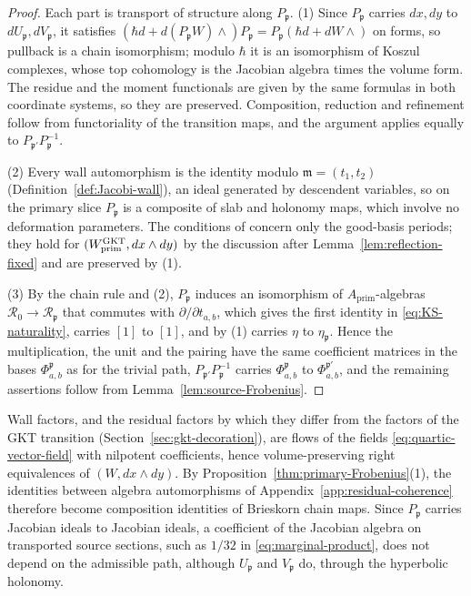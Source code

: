 \begin{proof}
Each part is transport of structure along $P_{\mathfrak p}$.  (1) Since
$P_{\mathfrak p}$ carries $dx,dy$ to $dU_{\mathfrak p},dV_{\mathfrak p}$, it
satisfies $(\hbar d+d(P_{\mathfrak p}W)\wedge)P_{\mathfrak p}
=P_{\mathfrak p}(\hbar d+dW\wedge)$ on forms, so pullback is a chain
isomorphism; modulo $\hbar$ it is an isomorphism of Koszul complexes, whose
top cohomology is the Jacobian algebra times the volume form.  The residue
and the moment functionals are given by the same formulas in both coordinate
systems, so they are preserved.  Composition, reduction and refinement
follow from functoriality of the transition maps, and the argument applies
equally to $P_{\mathfrak p'}P_{\mathfrak p}^{-1}$.

(2) Every wall automorphism is the identity modulo $\mathfrak m=(t_1,t_2)$
(Definition~\ref{def:Jacobi-wall}), an ideal generated by descendent
variables, so on the primary slice $P_{\mathfrak p}$ is a composite of slab
and holonomy maps, which involve no deformation parameters.  The conditions
of \cite[Def.~4.3]{grossetal2022open} concern only the good-basis periods; they hold for $(W^{\mathrm{GKT}}_{\mathrm{prim}},dx\wedge dy)$ by
the discussion after Lemma~\ref{lem:reflection-fixed} and are preserved by
(1).

(3) By the chain rule and (2), $P_{\mathfrak p}$ induces an isomorphism of
$A_{\mathrm{prim}}$-algebras $\mathcal R_0\to\mathcal R_{\mathfrak p}$ that
commutes with $\partial/\partial t_{a,b}$, which gives the first identity in
\eqref{eq:KS-naturality}, carries $[1]$ to $[1]$, and by (1) carries $\eta$
to $\eta_{\mathfrak p}$.  Hence the multiplication, the unit and the pairing
have the same coefficient matrices in the bases $\Phi^{\mathfrak p}_{a,b}$ as
for the trivial path, $P_{\mathfrak p'}P_{\mathfrak p}^{-1}$ carries
$\Phi^{\mathfrak p}_{a,b}$ to $\Phi^{\mathfrak p'}_{a,b}$, and the remaining
assertions follow from Lemma~\ref{lem:source-Frobenius}.
\end{proof}

Wall factors, and the residual factors by which they differ from the
factors of the GKT transition (Section~\ref{sec:gkt-decoration}), are flows of the fields
\eqref{eq:quartic-vector-field} with nilpotent coefficients, hence
volume-preserving right equivalences of $(W,dx\wedge dy)$.  By
Proposition~\ref{thm:primary-Frobenius}(1), the identities between algebra
automorphisms of Appendix~\ref{app:residual-coherence} therefore become
composition identities of Brieskorn chain maps.  Since $P_{\mathfrak p}$ carries Jacobian ideals to
Jacobian ideals, a coefficient of the Jacobian algebra on transported source
sections, such as $1/32$ in \eqref{eq:marginal-product}, does not depend on
the admissible path, although $U_{\mathfrak p}$ and $V_{\mathfrak p}$ do,
through the hyperbolic holonomy.

